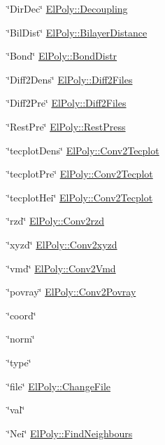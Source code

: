 \begin{DoxyItemize}
\item \char`\"{}\-Dir\-Dec\char`\"{} \hyperlink{classElPoly_a44e20767e332d941b94906f1a8e60e24}{\-El\-Poly\-::\-Decoupling} 
\item \char`\"{}\-Bil\-Dist\char`\"{} \hyperlink{classElPoly_a6f1477b110e5ee0e7e027466dac51b69}{\-El\-Poly\-::\-Bilayer\-Distance} 
\item \char`\"{}\-Bond\char`\"{} \hyperlink{classElPoly_a932a57ab32bd20f60bce8b498ca3095d}{\-El\-Poly\-::\-Bond\-Distr} 
\item \char`\"{}\-Diff2\-Dens\char`\"{} \hyperlink{classElPoly_a1c3688dd2704504d159802de5815643d}{\-El\-Poly\-::\-Diff2\-Files} 
\item \char`\"{}\-Diff2\-Pre\char`\"{} \hyperlink{classElPoly_a1c3688dd2704504d159802de5815643d}{\-El\-Poly\-::\-Diff2\-Files} 
\item \char`\"{}\-Rest\-Pre\char`\"{} \hyperlink{classElPoly_a019d255b1ff857ccd34550c7409a595b}{\-El\-Poly\-::\-Rest\-Press} 
\item \char`\"{}tecplot\-Dens\char`\"{} \hyperlink{classElPoly_ab03f8f580a4b45968aedcaa0d088c469}{\-El\-Poly\-::\-Conv2\-Tecplot} 
\item \char`\"{}tecplot\-Pre\char`\"{} \hyperlink{classElPoly_ab03f8f580a4b45968aedcaa0d088c469}{\-El\-Poly\-::\-Conv2\-Tecplot} 
\item \char`\"{}tecplot\-Hei\char`\"{} \hyperlink{classElPoly_ab03f8f580a4b45968aedcaa0d088c469}{\-El\-Poly\-::\-Conv2\-Tecplot} 
\item \char`\"{}rzd\char`\"{} \hyperlink{classElPoly_a538747fd3f643c9d171a00a5ec371ccc}{\-El\-Poly\-::\-Conv2rzd} 
\item \char`\"{}xyzd\char`\"{} \hyperlink{classElPoly_ad9aa947dfbb4fd8d4f2eb314efc17730}{\-El\-Poly\-::\-Conv2xyzd} 
\item \char`\"{}vmd\char`\"{} \hyperlink{classElPoly_a552193e7b9dea6d667fc1cd2ecab1482}{\-El\-Poly\-::\-Conv2\-Vmd} 
\item \char`\"{}povray\char`\"{} \hyperlink{classElPoly_ac2e836951a966bd69b21705cad363b95}{\-El\-Poly\-::\-Conv2\-Povray} 
\item \char`\"{}coord\char`\"{} 
\item \char`\"{}norm\char`\"{} 
\item \char`\"{}type\char`\"{} 
\item \char`\"{}file\char`\"{} \hyperlink{classElPoly_a5fa485410c0b7e02f523f96f33504435}{\-El\-Poly\-::\-Change\-File} 
\item \char`\"{}val\char`\"{} 
\item \char`\"{}\-Nei\char`\"{} \hyperlink{classVarData_ac99cf9cb839b06e0c3e32ebb8d11d6be}{\-El\-Poly\-::\-Find\-Neighbours} 

\end{DoxyItemize}
